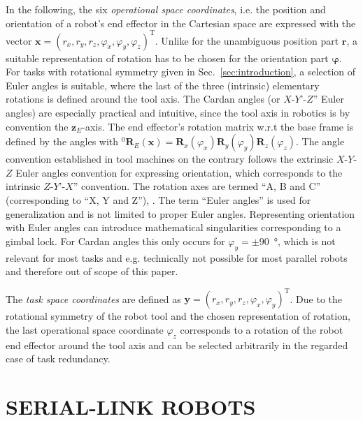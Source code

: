 \documentclass[a4paper,twoside]{article}
\newcommand{\transp}[0]{{\mathrm{T}}}
\newcommand{\rotmat}[2]{{{ }^{#1}\boldsymbol{R}}_{#2}}
\begin{document}
In the following, the six \emph{operational space coordinates}, i.e. the position and orientation of a robot's end effector in the Cartesian space are expressed with the vector $\bm{x}=(r_x,r_y,r_z,\varphi_x,\varphi_y,\varphi_z)^\transp$.
Unlike for the unambiguous position part $\bm{r}$, a suitable representation of rotation has to be chosen for the orientation part $\bm{\varphi}$.
For tasks with rotational symmetry given in Sec.~\ref{sec:introduction}, a selection of Euler angles is suitable, where the last of the three (intrinsic) elementary rotations is defined around the tool axis.
The Cardan angles (or $X$-$Y$'-$Z$'' Euler angles) are especially practical and intuitive, since the tool axis in robotics is by convention the $\bm{z}_E$-axis. 
The end effector's rotation matrix w.r.t the base frame is defined by the angles with $\rotmat{0}{E}(\bm{x})=\bm{R}_x(\varphi_x) \bm{R}_y(\varphi_y) \bm{R}_z(\varphi_z)$.
The angle convention established in tool machines on the contrary follows the extrinsic $X$-$Y$-$Z$ Euler angles convention for expressing orientation, which corresponds to the intrinsic $Z$-$Y$'-$X$'' convention.
The rotation axes are termed ``A, B and C'' (corresponding to ``X, Y and Z''), \cite{SmirnovPlyMir2013}.
The term ``Euler angles'' is used for generalization and is not limited to proper Euler angles.
Representing orientation with Euler angles can introduce mathematical singularities corresponding to a gimbal lock.
For Cardan angles this only occurs for $\varphi_y{=}\pm$\SI{90}{\degree}, which is not relevant for most tasks and e.g. technically not possible for most parallel robots and therefore out of scope of this paper.

The \emph{task space coordinates} are defined as ${\bm{y}=(r_x,r_y,r_z,\varphi_x,\varphi_y)^\transp}$.
Due to the rotational symmetry of the robot tool and the chosen representation of rotation, the last operational space coordinate $\varphi_z$ corresponds to a rotation of the robot end effector around the tool axis and can be selected arbitrarily in the regarded case of task redundancy. %

\section{\uppercase{Serial-Link Robots}}
\label{sec:serrob}
\end{document}
